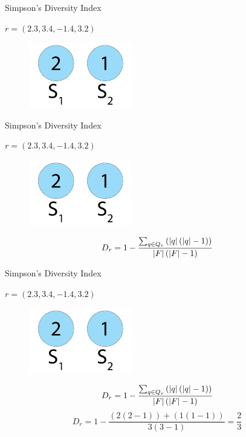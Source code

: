 \begin{frame}{Simpson's Diversity Index}
\begin{center}
$r = (2.3, 3.4, -1.4, 3.2)$
  \begin{figure}[p]
  \includegraphics[width=0.4\textwidth]{images/speciessize.png}
  \end{figure}
\end{center}
\end{frame}

\begin{frame}{Simpson's Diversity Index}
\begin{center}
$r = (2.3, 3.4, -1.4, 3.2)$
  \begin{figure}[p]
  \includegraphics[width=0.4\textwidth]{images/speciessize.png}
  \end{figure}
\begin{equation}
D_r = 1 - \frac{\sum_{q \in Q_{r}}\left(\lvert q\rvert\left(\lvert q\rvert - 1\right)\right)}{\lvert F\rvert\left(\lvert F\rvert - 1\right)}
\end{equation}
\end{center}
\end{frame}

\begin{frame}{Simpson's Diversity Index}
\begin{center}
$r = (2.3, 3.4, -1.4, 3.2)$
  \begin{figure}[p]
  \includegraphics[width=0.4\textwidth]{images/speciessize.png}
  \end{figure}
\begin{equation}
D_r = 1 - \frac{\sum_{q \in Q_{r}}\left(\lvert q\rvert\left(\lvert q\rvert - 1\right)\right)}{\lvert F\rvert\left(\lvert F\rvert - 1\right)}
\end{equation}
\begin{equation}\label{eq:nntd}
D_r = 1 - \frac{(2(2-1))+(1(1-1))}{3(3-1)} = \frac{2}{3}
\end{equation}
\end{center}
\end{frame}

